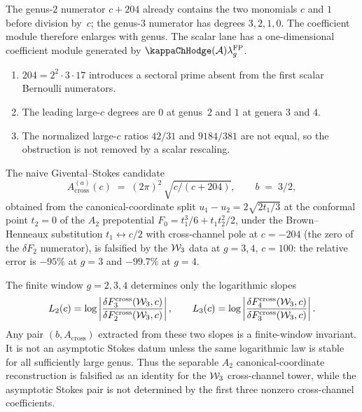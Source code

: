 \begin{remark}
The genus-$2$ numerator $c+204$ already contains the two monomials
$c$ and $1$ before division by~$c$; the genus-$3$ numerator has
degrees $3,2,1,0$. The coefficient module therefore enlarges with
genus. The scalar lane has a one-dimensional coefficient module
generated by $\kappaChHodge(\cA)\lambda_g^{\mathrm{FP}}$.
\begin{enumerate}[label=\textup{(\roman*)}]
\item $204=2^2\cdot 3\cdot 17$ introduces a sectoral prime absent
from the first scalar Bernoulli numerators.
\item The leading large-$c$ degrees are $0$ at genus~$2$ and $1$ at
genera $3$ and $4$.
\item The normalized large-$c$ ratios $42/31$ and $9184/381$ are not
equal, so the obstruction is not removed by a scalar rescaling.
\end{enumerate}
\end{remark}

\begin{proposition}
\label{prop:f3-givental-stokes-falsification}
The naive Givental--Stokes candidate
\[
 A_{\mathrm{cross}}^{(a)}(c)
 \;=\;
 (2 \pi)^2\, \sqrt{c/(c + 204)},
\qquad
 b \;=\; 3/2,
\]
obtained from the canonical-coordinate split
$u_1 - u_2 = 2 \sqrt{2 t_1 / 3}$ at the conformal point $t_2 = 0$
of the $A_2$ prepotential
$F_0 = t_1^3 / 6 + t_1 t_2^2 / 2$, under the Brown--Henneaux
substitution $t_1 \leftrightarrow c/2$ with cross-channel pole at
$c = -204$ (the zero of the $\delta F_2$ numerator), is falsified
by the $\mathcal{W}_3$ data at $g = 3, 4$, $c = 100$: the relative error
is $-95\%$ at $g = 3$ and $-99.7\%$ at $g = 4$.

The finite window $g=2,3,4$ determines only the logarithmic slopes
\[
L_2(c)=\log\left|
\frac{\delta F_3^{\mathrm{cross}}(\mathcal{W}_3,c)}
{\delta F_2^{\mathrm{cross}}(\mathcal{W}_3,c)}
\right|,
\qquad
L_3(c)=\log\left|
\frac{\delta F_4^{\mathrm{cross}}(\mathcal{W}_3,c)}
{\delta F_3^{\mathrm{cross}}(\mathcal{W}_3,c)}
\right|.
\]
Any pair $(b,A_{\mathrm{cross}})$ extracted from these two slopes is
a finite-window invariant. It is not an asymptotic Stokes datum unless
the same logarithmic law is stable for all sufficiently large genus.
Thus the separable $A_2$ canonical-coordinate reconstruction is
falsified as an identity for the $\mathcal{W}_3$ cross-channel tower, while
the asymptotic Stokes pair is not determined by the first three
nonzero cross-channel coefficients.
\end{proposition}

